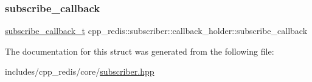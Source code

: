 \mbox{\label{structcpp__redis_1_1subscriber_1_1callback__holder_a80849894dab4dc10d61d52f9c405a040}} 
\subsubsection{\texorpdfstring{subscribe\+\_\+callback}{subscribe\_callback}}
{\footnotesize\ttfamily \hyperlink{classcpp__redis_1_1subscriber_ac6ab8ebc526d784e4b79a39bbd73dca8}{subscribe\+\_\+callback\+\_\+t} cpp\+\_\+redis\+::subscriber\+::callback\+\_\+holder\+::subscribe\+\_\+callback}



The documentation for this struct was generated from the following file\+:\begin{DoxyCompactItemize}
\item 
includes/cpp\+\_\+redis/core/\hyperlink{subscriber_8hpp}{subscriber.\+hpp}\end{DoxyCompactItemize}

